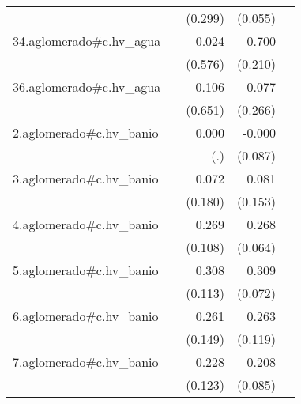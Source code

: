 {\begin{longtable}{l*{4}{D{.}{.}{-1}}}
            &                     &     (0.299)         &     (0.055)         &                     \\
\addlinespace
34.aglomerado#c.hv\_agua&                     &       0.024         &       0.700\sym{***}&                     \\
            &                     &     (0.576)         &     (0.210)         &                     \\
\addlinespace
36.aglomerado#c.hv\_agua&                     &      -0.106         &      -0.077         &                     \\
            &                     &     (0.651)         &     (0.266)         &                     \\
\addlinespace
2.aglomerado#c.hv\_banio&                     &       0.000         &      -0.000         &                     \\
            &                     &         (.)         &     (0.087)         &                     \\
\addlinespace
3.aglomerado#c.hv\_banio&                     &       0.072         &       0.081         &                     \\
            &                     &     (0.180)         &     (0.153)         &                     \\
\addlinespace
4.aglomerado#c.hv\_banio&                     &       0.269\sym{*}  &       0.268\sym{***}&                     \\
            &                     &     (0.108)         &     (0.064)         &                     \\
\addlinespace
5.aglomerado#c.hv\_banio&                     &       0.308\sym{**} &       0.309\sym{***}&                     \\
            &                     &     (0.113)         &     (0.072)         &                     \\
\addlinespace
6.aglomerado#c.hv\_banio&                     &       0.261         &       0.263\sym{*}  &                     \\
            &                     &     (0.149)         &     (0.119)         &                     \\
\addlinespace
7.aglomerado#c.hv\_banio&                     &       0.228         &       0.208\sym{*}  &                     \\
            &                     &     (0.123)         &     (0.085)         &                     \\

\end{longtable}}
